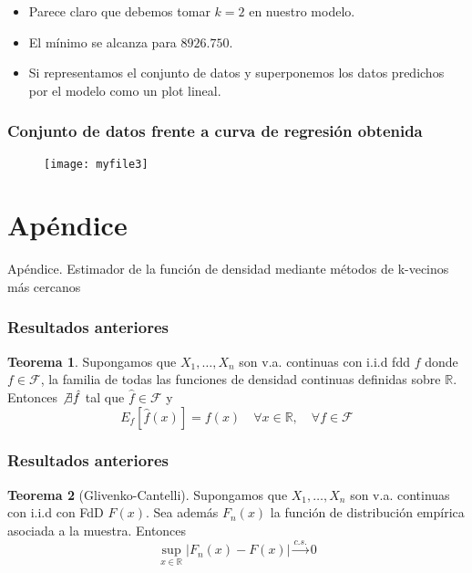 \documentclass{beamer}
\theoremstyle{definition}
\newtheorem{teorema}{Teorema}
\newcommand{\R}{\mathbb{R}}
\begin{document}
\begin{frame}
\begin{itemize}
\item Parece claro que debemos tomar $k=2$ en nuestro modelo.
\item El mínimo se alcanza para $8926.750$.
\item Si representamos el conjunto de datos y superponemos los datos predichos por el modelo como un plot lineal.
\end{itemize}
\end{frame}


\begin{frame}
\frametitle{Conjunto de datos frente a curva de regresión obtenida}
\begin{figure}[h!]
\texttt{[image: myfile3]}
\end{figure}
\end{frame}

\section{Apéndice}

\begin{frame}
\begin{center}
\huge{Apéndice. Estimador de la función de densidad mediante métodos de k-vecinos más cercanos}
\end{center}
\end{frame}

\begin{frame}
\frametitle{Resultados anteriores}
\begin{teorema}
Supongamos que $X_1,\dotsc,X_n$ son v.a. continuas con i.i.d fdd $f$ donde $f\in \mathcal{F}$, la familia de todas las funciones de densidad continuas definidas sobre $\R$. Entonces $\not\exists\hat{f}$ tal que $\hat{f}\in \mathcal{F}$ y 
$$
E_f[\hat{f}(x)]=f(x) \quad \forall x \in \R, \quad \forall f \in\mathcal{F}
$$
\end{teorema}
\end{frame}



\begin{frame}
\frametitle{Resultados anteriores}

\begin{teorema}[Glivenko-Cantelli]
Supongamos que $X_1,\dotsc,X_n$ son v.a. continuas con i.i.d con FdD $F(x)$. Sea además $F_n(x)$ la función de distribución empírica asociada a la muestra. Entonces
$$
\sup_{x\in \R}\lvert F_n(x)-F(x)\rvert \overset{c.s.}{\longrightarrow} 0
$$
\end{teorema}
\end{frame}
\end{document}
